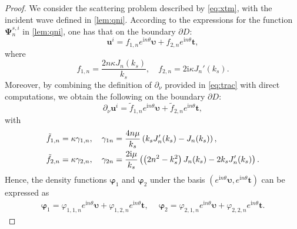 \documentclass[11pt,reqno,twoside]{amsart}
\theoremstyle{definition}
\theoremstyle{remark}
\numberwithin{equation}{section}
\newcommand{\bu}{\mathbf{u}}
\begin{document}
\begin{proof}
	We consider the scattering problem described by \eqref{eq:xtm}, with the incident wave defined in \eqref{lem:qni}. According to the expressions for the function \(\bm{\Psi}_{n}^{s,i}\) in \eqref{lem:qni}, one has that on the boundary \(\partial D\):
	\begin{displaymath}
		{\bu}^{i}=f_{1,n}e^{\mathrm{i}n\theta}\bm{\upsilon }+f_{2,n}e^{\mathrm{i}n\theta}\bm{t },
	\end{displaymath}
	where
	\begin{displaymath}
		f_{1,n}=\frac{2n\kappa J_n(k_{s})}{k_{s}},\quad f_{2,n}=2\mathrm{i}\kappa J_{n}'(k_{s}).
	\end{displaymath}
	Moreover, by combining the definition of \(\partial_\nu\) provided in \eqref{eq:trac} with direct computations, we obtain the following on the boundary \(\partial D\):
	\begin{displaymath}
		\partial_\nu\bu^{i}=\tilde{f}_{1,n}e^{\mathrm{i}n\theta}\bm{\upsilon }+\tilde{f}_{2,n}e^{\mathrm{i}n\theta}\bm{t },
	\end{displaymath}
	with \begin{align}
		\tilde{f}_{1,n}&=\kappa \gamma_{1,n},\quad \gamma_{1n}=\frac{4n\mu}{k_s}\left(k_sJ_n'(k_s)-J_n(k_s)\right),\notag\\
		\tilde{f}_{2,n}&=\kappa \gamma_{2,n},\quad \gamma_{2n}=\frac{2\mathrm{i}\mu}{k_s}\left(\left(2n^2-k_s^2\right)J_n(k_s)-2k_sJ_n'(k_s)\right).\notag
	\end{align}
	Hence, the density functions \(\bm{\varphi}_{1}\) and \(\bm{\varphi}_{2}\) under the basis \(\left(e^{\mathrm{i}n\theta}\bm{\upsilon}, e^{\mathrm{i}n\theta}\bm{t}\right)\) can be expressed as
	\begin{align}\label{eq:phizh}
		\bm{\varphi}_1=\varphi_{1,1,n}e^{\mathrm{i}n\theta}\bm{\upsilon }+\varphi_{1,2,n}e^{\mathrm{i}n\theta}\bm{t },\quad\ \bm{\varphi}_2=\varphi_{2,1,n}e^{\mathrm{i}n\theta}\bm{\upsilon }+\varphi_{2,2,n}e^{\mathrm{i}n\theta}\bm{t }.
	\end{align}
	

\end{proof}
\end{document}

